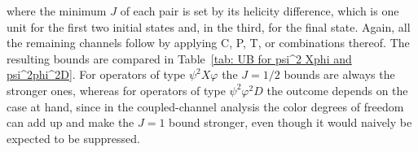 where the minimum $J$ of each pair is set by its helicity difference, which is one unit for
the first two initial states and, in the third, for the final state.
Again, all the remaining channels follow
by applying C, P, T, or combinations thereof.
The resulting bounds are compared in Table~\ref{tab: UB for psi^2 Xphi and psi^2phi^2D}. For
operators of type $\psi^2X\varphi$ the $J=1/2$ bounds are always the stronger ones, whereas for
operators of type $\psi^2\varphi^2D$ the outcome depends on the case at hand, since in the
coupled-channel analysis the color degrees of freedom can add up and make the $J=1$ bound stronger,
even though it would naively be expected to be suppressed.



